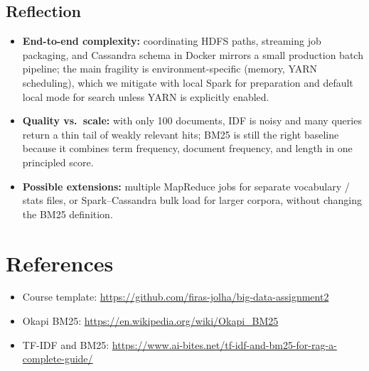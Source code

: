 \documentclass[11pt,a4paper]{article}
\begin{document}
\subsection{Reflection}
\begin{itemize}[leftmargin=*]
  \item \textbf{End-to-end complexity:} coordinating HDFS paths, streaming job packaging, and Cassandra schema in Docker mirrors a small production batch pipeline; the main fragility is environment-specific (memory, YARN scheduling), which we mitigate with local Spark for preparation and default local mode for search unless YARN is explicitly enabled.
  \item \textbf{Quality vs.\ scale:} with only 100 documents, IDF is noisy and many queries return a thin tail of weakly relevant hits; BM25 is still the right baseline because it combines term frequency, document frequency, and length in one principled score.
  \item \textbf{Possible extensions:} multiple MapReduce jobs for separate vocabulary / stats files, or Spark--Cassandra bulk load for larger corpora, without changing the BM25 definition.
\end{itemize}

\section*{References}
\small
\begin{itemize}[leftmargin=*]
  \item Course template: \url{https://github.com/firas-jolha/big-data-assignment2}
  \item Okapi BM25: \url{https://en.wikipedia.org/wiki/Okapi_BM25}
  \item TF-IDF and BM25: \url{https://www.ai-bites.net/tf-idf-and-bm25-for-rag-a-complete-guide/}
\end{itemize}
\end{document}
